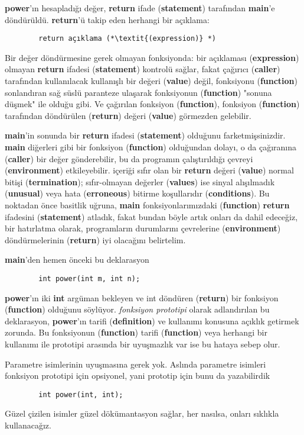 \documentclass[a4paper,12pt,oneside]{book}
\begin{document}
\par \textbf{power}'ın hesapladığı değer, \textbf{return} ifade (\textbf{statement}) tarafından \textbf{main}'e döndürüldü. \textbf{return}'ü takip eden herhangi bir açıklama:
\begin{lstlisting}
		return açıklama (*\textit{(expression)} *)
\end{lstlisting}
Bir değer döndürmesine gerek olmayan fonksiyonda: bir açıklaması (\textbf{expression}) olmayan \textbf{return} ifadesi (\textbf{statement}) kontrolü sağlar, fakat çağırıcı (\textbf{caller}) tarafından kullanılacak kullanışlı bir değeri (\textbf{value}) değil, fonksiyonu (\textbf{function}) sonlandıran sağ süslü paranteze ulaşarak fonksiyonun (\textbf{function}) "sonuna düşmek" ile olduğu gibi. Ve çağırılan fonksiyon (\textbf{function}), fonksiyon (\textbf{function}) tarafından döndürülen (\textbf{return}) değeri (\textbf{value}) görmezden gelebilir.
\par \textbf{main}'in sonunda bir \textbf{return} ifadesi (\textbf{statement}) olduğunu farketmişsinizdir.  \textbf{main} diğerleri gibi bir fonksiyon (\textbf{function}) olduğundan dolayı, o da çağıranına (\textbf{caller}) bir değer gönderebilir, bu da programın çalıştırıldığı çevreyi (\textbf{environment}) etkileyebilir. içeriği sıfır olan bir \textbf{return} değeri (\textbf{value}) normal bitişi (\textbf{termination}); sıfır-olmayan değerler (\textbf{values}) ise sinyal alışılmadık (\textbf{unusual}) veya hata (\textbf{erroneous}) bitirme koşullarıdır (\textbf{conditions}). Bu noktadan önce basitlik uğruna, \textbf{main} fonksiyonlarımızdaki (\textbf{function}) \textbf{return} ifadesini (\textbf{statement}) atladık, fakat bundan böyle artık onları da dahil edeceğiz, bir hatırlatma olarak, programların durumlarını çevrelerine (\textbf{environment}) döndürmelerinin (\textbf{return}) iyi olacağını belirtelim.
\par \textbf{main}'den hemen önceki bu deklarasyon
\begin{lstlisting}
		int power(int m, int n);
\end{lstlisting}
\textbf{power}'ın iki \textbf{int} argüman bekleyen ve int döndüren (\textbf{return}) bir fonksiyon (\textbf{function}) olduğunu söylüyor. \textit{fonksiyon prototipi} olarak adlandırılan bu deklarasyon, \textbf{power}'ın tarifi (\textbf{definition}) ve kullanımı konusuna açıklık getirmek zorunda. Bu fonksiyonun (\textbf{function}) tarifi (\textbf{function}) veya herhangi bir kullanımı ile prototipi arasında bir uyuşmazlık var ise bu hataya sebep olur.
\par Parametre isimlerinin uyuşmasına gerek yok. Aslında parametre isimleri fonksiyon prototipi için opsiyonel, yani prototip için bunu da yazabilirdik
\begin{lstlisting}
		int power(int, int);
\end{lstlisting}
Güzel çizilen isimler güzel dökümantasyon sağlar, her nasılsa, onları sıklıkla kullanacağız.
\end{document}
